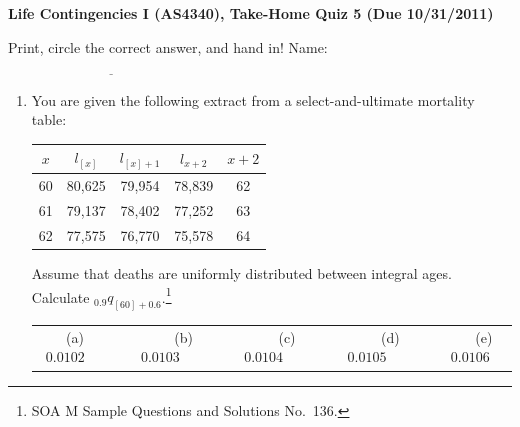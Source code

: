 \documentclass[11pt,fleqn,oneside]{book}
\begin{document}

\newpage

\thispagestyle{empty}
\setcounter{page}{1}
\begin{center}
{ \large \bf Life Contingencies I (AS4340), Take-Home Quiz 5 (Due 10/31/2011)}
\end{center}
\noindent
Print, circle the correct answer, and hand in! Name: $\underline{\;\;\;\;\;\;\;\;\;\;\;\;\;\;\;\;\;\;\;\;\;\;\;\;\;\;\;\;\;\;\;\;\;\;\;\;\;\;\;\;\;\;\;\;\;\;\;\;\;\;\;\;\;}$
\begin{enumerate}
\item You are given the following extract from a select-and-ultimate mortality table:
\begin{center}
\begin{tabular}{c || c c c || c}
$x$ & $l_{[x]}$ & $l_{[x]+1}$ & $l_{x+2}$ & $x+2$\\
\hline
60 & 80,625 & 79,954 & 78,839 & 62\\
61 & 79,137 & 78,402 & 77,252 & 63\\
62 & 77,575 & 76,770 & 75,578 &  64\\ 
\end{tabular}
\end{center}
Assume that deaths are uniformly distributed between integral ages.\\
Calculate ${_{0.9}q_{[60]+0.6}}$.\footnote[1]{SOA M Sample Questions and Solutions  No.\ 136.}
\vspace{0.1cm}
\begin{center}
\small
\begin{tabular}{c c c c c}
(a) $0.0102\;\;\;\;\;$ & 
$\;\;\;\;\;\;\;$(b) $0.0103\;\;\;\;\;$ &
$\;\;\;\;\;\;\;$(c) $0.0104\;\;\;\;\;$ & 
$\;\;\;\;\;\;\;$(d) $0.0105\;\;\;\;\;$ &
$\;\;\;\;\;\;\;$(e) $0.0106$
\end{tabular}
\end{center}
\vspace{0.1cm}

\normalsize


\end{enumerate}
\end{document}
